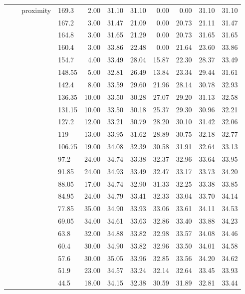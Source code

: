 \begin{longtable}{llllrrrrrrr}
   &  & proximity & 169.3 & 2.00 & 31.10 & 31.10 & 0.00 & 0.00 & 31.10 & 31.10 \\ 
   &  &  & 167.2 & 3.00 & 31.47 & 21.09 & 0.00 & 20.73 & 21.11 & 31.47 \\ 
   &  &  & 164.8 & 3.00 & 31.65 & 21.29 & 0.00 & 20.73 & 31.65 & 31.65 \\ 
   &  &  & 160.4 & 3.00 & 33.86 & 22.48 & 0.00 & 21.64 & 23.60 & 33.86 \\ 
   &  &  & 154.7 & 4.00 & 33.49 & 28.04 & 15.87 & 22.30 & 28.37 & 33.49 \\ 
   &  &  & 148.55 & 5.00 & 32.81 & 26.49 & 13.84 & 23.34 & 29.44 & 31.61 \\ 
   &  &  & 142.4 & 8.00 & 33.59 & 29.60 & 21.96 & 28.14 & 30.78 & 32.93 \\ 
   &  &  & 136.35 & 10.00 & 33.50 & 30.28 & 27.07 & 29.20 & 31.13 & 32.58 \\ 
   &  &  & 131.15 & 10.00 & 33.50 & 30.18 & 25.37 & 29.30 & 30.96 & 32.21 \\ 
   &  &  & 127.2 & 12.00 & 33.21 & 30.79 & 28.20 & 30.10 & 31.42 & 32.06 \\ 
   &  &  & 119 & 13.00 & 33.95 & 31.62 & 28.89 & 30.75 & 32.18 & 32.77 \\ 
   &  &  & 106.75 & 19.00 & 34.08 & 32.39 & 30.58 & 31.91 & 32.64 & 33.13 \\ 
   &  &  & 97.2 & 24.00 & 34.74 & 33.38 & 32.37 & 32.96 & 33.64 & 33.95 \\ 
   &  &  & 91.85 & 24.00 & 34.93 & 33.49 & 32.47 & 33.17 & 33.73 & 34.20 \\ 
   &  &  & 88.05 & 17.00 & 34.74 & 32.90 & 31.33 & 32.25 & 33.38 & 33.85 \\ 
   &  &  & 84.95 & 24.00 & 34.79 & 33.41 & 32.33 & 33.04 & 33.70 & 34.14 \\ 
   &  &  & 77.85 & 35.00 & 34.90 & 33.93 & 33.06 & 33.61 & 34.11 & 34.53 \\ 
   &  &  & 69.05 & 34.00 & 34.61 & 33.63 & 32.86 & 33.40 & 33.88 & 34.23 \\ 
   &  &  & 63.8 & 32.00 & 34.88 & 33.82 & 32.98 & 33.57 & 34.08 & 34.46 \\ 
   &  &  & 60.4 & 30.00 & 34.90 & 33.82 & 32.96 & 33.50 & 34.01 & 34.58 \\ 
   &  &  & 57.6 & 30.00 & 35.05 & 33.96 & 32.85 & 33.56 & 34.20 & 34.62 \\ 
   &  &  & 51.9 & 23.00 & 34.57 & 33.24 & 32.14 & 32.64 & 33.45 & 33.93 \\ 
   &  &  & 44.5 & 18.00 & 34.15 & 32.38 & 30.59 & 31.89 & 32.81 & 33.44 \\ 

\end{longtable}
